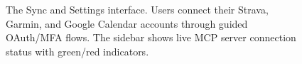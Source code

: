 \begin{figure}[ht]
\centering
{}
\caption[Sync and settings interface]{The Sync and Settings interface. Users connect their Strava, Garmin, and Google Calendar accounts through guided OAuth/MFA flows. The sidebar shows live MCP server connection status with green/red indicators.}\label{fig:screenshot_sync}
\end{figure}
